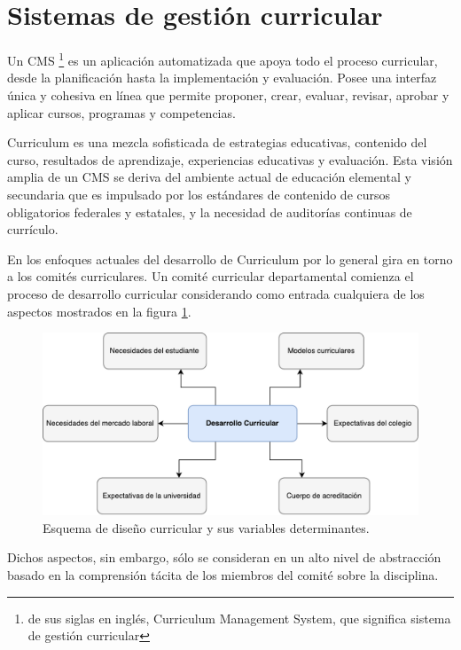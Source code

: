 \section{Sistemas de gestión curricular}
Un CMS \footnote{de sus siglas en inglés, Curriculum Management System, que significa sistema de gestión curricular} es un aplicación automatizada que apoya todo el proceso curricular, desde la planificación hasta la implementación y evaluación. Posee una interfaz única y cohesiva en línea que permite proponer, crear, evaluar, revisar, aprobar y aplicar cursos, programas y competencias.

Curriculum es una mezcla sofisticada de estrategias educativas, contenido del curso, resultados de aprendizaje, experiencias educativas y evaluación\citep{harden2001amee}. Esta visión amplia de un CMS se deriva del ambiente actual de educación elemental y secundaria que es impulsado por los estándares de contenido de cursos obligatorios federales y estatales, y la necesidad de auditorías continuas de currículo\citep{west2000technology}.

En los enfoques actuales del desarrollo de Curriculum por lo general gira en torno a los comités curriculares. Un comité curricular departamental comienza el proceso de desarrollo curricular considerando como entrada cualquiera de los aspectos mostrados en la figura \ref{diseno_curricular}.

\begin{figure}[H]
\centering
\includegraphics[width=125mm,scale=1]{Figuras/diseno_curricular}
\caption{Esquema de diseño curricular y sus variables determinantes.}
  \label{diseno_curricular}
\end{figure}


Dichos aspectos, sin embargo, sólo se consideran en un alto nivel de abstracción basado en la comprensión tácita de los miembros del comité sobre la disciplina.